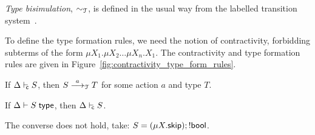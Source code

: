 \emph{Type bisimulation}, $\sim_\mathcal T$, is defined in the usual way from the
labelled transition system~\cite{sangiorgi2014introduction}.
%

To define the type formation rules, we need the notion of contractivity, 
forbidding subterms of the form 
$\mu X_1.\mu X_2 \dots \mu X_n. X_1$. The contractivity and type
formation
rules are given in Figure~\ref{fig:contractivity_type_form_rules}.




\begin{lemma}
\label{lemma:contr_has_transition}
If ${\Delta}\vdash_{\!\!\mathsf c}{S}$, then $S \stackrel{a}{\longrightarrow}_\mathcal T T$ for some action $a$  and type $T$. 
\end{lemma}

\begin{lemma}
	If ${\Delta} \vdash {S}\;\mathsf{type}$, then ${\Delta}\vdash_{\!\!\mathsf c}{S}$.
\end{lemma}
The converse does not hold, take: $S = (\mu X. \mathsf{skip}); !\mathsf{bool}$.
\
